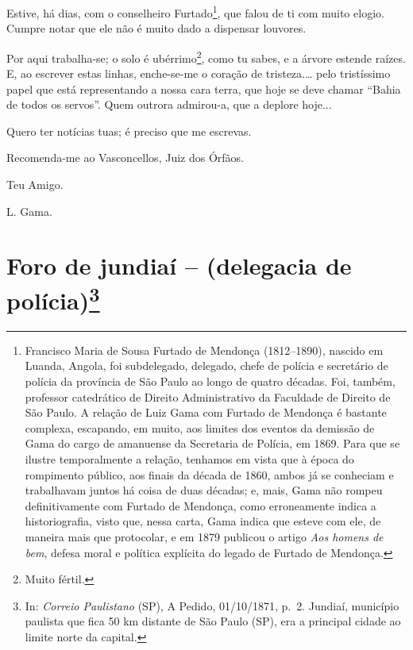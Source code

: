 {Estive, há dias, com o conselheiro Furtado\footnote{ Francisco Maria de
  Sousa Furtado de Mendonça (1812--1890), nascido em Luanda, Angola, foi
  subdelegado, delegado, chefe de polícia e secretário de polícia da
  província de São Paulo ao longo de quatro décadas. Foi, também,
  professor catedrático de Direito Administrativo da Faculdade de
  Direito de São Paulo. A relação de Luiz Gama com Furtado de Mendonça é
  bastante complexa, escapando, em muito, aos limites dos eventos da
  demissão de Gama do cargo de amanuense da Secretaria de Polícia, em
  1869. Para que se ilustre temporalmente a relação, tenhamos em vista
  que à época do rompimento público, aos finais da década de 1860, ambos
  já se conheciam e trabalhavam juntos há coisa de duas décadas; e,
  mais, Gama não rompeu definitivamente com Furtado de Mendonça, como
  erroneamente indica a historiografia, visto que, nessa carta, Gama
  indica que esteve com ele, de maneira mais que protocolar, e em 1879
  publicou o artigo \emph{Aos homens de bem}, defesa moral e política
  explícita do legado de Furtado de Mendonça.}, que falou de ti com
muito elogio. Cumpre notar que ele não é muito dado a dispensar
louvores.

Por aqui {trabalha-se}; o solo é ubérrimo\footnote{ Muito fértil.},
como tu sabes, e a árvore estende raízes. E, ao escrever estas linhas,
enche-se-me o coração de tristeza.\ldots{} pelo tristíssimo papel que
está representando a nossa cara terra, que hoje se deve chamar ``Bahia de
todos os servos''. Quem outrora admirou-a, que a deplore hoje...

Quero ter notícias tuas; é preciso que me escrevas.

Recomenda-me ao Vasconcellos, Juiz dos Órfãos.

Teu Amigo.

L. Gama.

\chapter{Foro de jundiaí -- (delegacia de polícia)\footnote{ In: \emph{Correio Paulistano} (SP), A Pedido, 01/10/1871,
  p.~2. Jundiaí, município paulista que fica 50 km distante de São Paulo
  (SP), era a principal cidade ao limite norte da capital.}} %

}
